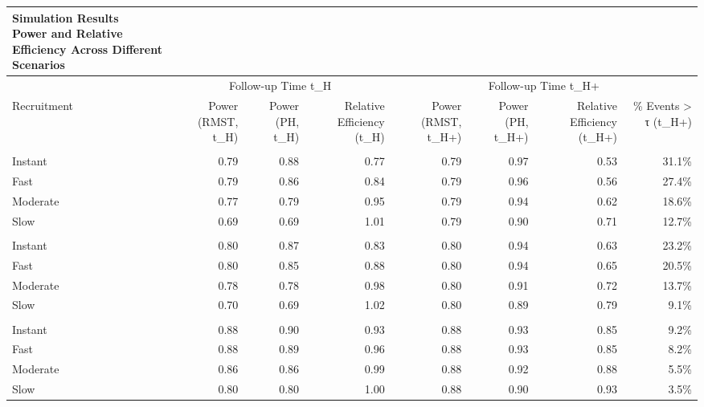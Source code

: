 \begingroup
\fontsize{12.0pt}{14.4pt}\selectfont
\begin{longtable}{lrrrrrrr}
\caption*{
{\large Simulation Results} \\ 
{\small Power and Relative Efficiency Across Different Scenarios}
} \\ 
\toprule
 & \multicolumn{3}{c}{Follow-up Time t\_H} & \multicolumn{4}{c}{Follow-up Time t\_H+} \\ 
\cmidrule(lr){2-4} \cmidrule(lr){5-8}
Recruitment & Power (RMST, t\_H) & Power (PH, t\_H) & Relative Efficiency (t\_H) & Power (RMST, t\_H+) & Power (PH, t\_H+) & Relative Efficiency (t\_H+) & \% Events > τ (t\_H+) \\ 
\midrule\addlinespace[2.5pt]
\multicolumn{8}{l}{Low} \\[2.5pt] 
\midrule\addlinespace[2.5pt]
Instant & 0.79 & 0.88 & 0.77 & 0.79 & 0.97 & 0.53 & 31.1\% \\ 
Fast & 0.79 & 0.86 & 0.84 & 0.79 & 0.96 & 0.56 & 27.4\% \\ 
Moderate & 0.77 & 0.79 & 0.95 & 0.79 & 0.94 & 0.62 & 18.6\% \\ 
Slow & 0.69 & 0.69 & 1.01 & 0.79 & 0.90 & 0.71 & 12.7\% \\ 
\midrule\addlinespace[2.5pt]
\multicolumn{8}{l}{Moderate} \\[2.5pt] 
\midrule\addlinespace[2.5pt]
Instant & 0.80 & 0.87 & 0.83 & 0.80 & 0.94 & 0.63 & 23.2\% \\ 
Fast & 0.80 & 0.85 & 0.88 & 0.80 & 0.94 & 0.65 & 20.5\% \\ 
Moderate & 0.78 & 0.78 & 0.98 & 0.80 & 0.91 & 0.72 & 13.7\% \\ 
Slow & 0.70 & 0.69 & 1.02 & 0.80 & 0.89 & 0.79 & 9.1\% \\ 
\midrule\addlinespace[2.5pt]
\multicolumn{8}{l}{High} \\[2.5pt] 
\midrule\addlinespace[2.5pt]
Instant & 0.88 & 0.90 & 0.93 & 0.88 & 0.93 & 0.85 & 9.2\% \\ 
Fast & 0.88 & 0.89 & 0.96 & 0.88 & 0.93 & 0.85 & 8.2\% \\ 
Moderate & 0.86 & 0.86 & 0.99 & 0.88 & 0.92 & 0.88 & 5.5\% \\ 
Slow & 0.80 & 0.80 & 1.00 & 0.88 & 0.90 & 0.93 & 3.5\% \\ 
\bottomrule
\end{longtable}
\endgroup

